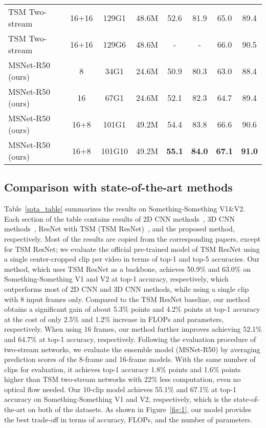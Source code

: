 \documentclass[runningheads]{llncs}
\newcommand{\cmark}{\ding{51}}\newcommand{\xmark}{\ding{55}}
\begin{document}
\begin{table}[h]
{\begin{tabular}{lcccccccc}
TSM Two-stream~\cite{lin2019tsm} & \cmark   	& 16+16  & 129G1 & 48.6M & 52.6 &   81.9 & 65.0 & 89.4\\TSM Two-stream~\cite{lin2019tsm} & \cmark   	& 16+16  & 129G6 & 48.6M & - &   - &66.0 & 90.5\\\midrule
MSNet-R50 (ours) &	& 8 & 34G1 & 24.6M & 50.9 & 80.3 & 63.0 & 88.4 \\ 
MSNet-R50 (ours) &	& 16 & 67G1 & 24.6M & 52.1 & 82.3 & 64.7 & 89.4  \\   
MSNet-R50 (ours) &	 & 16+8 & 101G1 & 49.2M & 54.4 & 83.8 & 66.6 & 90.6 \\ 
MSNet-R50 (ours) &	 & 16+8 & 101G10 & 49.2M & \textbf{55.1} & \textbf{84.0} & \textbf{67.1} & \textbf{91.0}  \\
\bottomrule
\end{tabular}
}
\end{table}

\subsection{Comparison with state-of-the-art methods}

Table~\ref{sota_table} summarizes the results on Something-Something V1\&V2.
Each section of the table contains results of 2D CNN methods~\cite{lee2018motion,liu2019learning,wang2016temporal,zhou2018temporal}, 3D CNN methods~\cite{jiang2019stm,martinez2019action,wang2018videos,xie2018rethinking,zolfaghari2018eco}, ResNet with TSM (TSM ResNet)~\cite{lin2019tsm}, and the proposed method, respectively. Most of the results are copied from the corresponding papers, except for TSM ResNet; we evaluate the official pre-trained model of TSM ResNet using a single center-cropped clip per video in terms of top-1 and top-5 accuracies.
Our method, which uses TSM ResNet as a backbone, achieves 50.9\% and 63.0\% on Something-Something V1 and V2 at top-1 accuracy, respectively, which outperforms most of 2D CNN and 3D CNN methods, while using a single clip with 8 input frames only.
Compared to the TSM ResNet baseline, our method obtains a significant gain of about 5.3\% points and 4.2\% points at top-1 accuracy at the cost of only 2.5\% and 1.2\% increase in FLOPs and parameters, respectively.
When using 16 frames, our method further improves achieving 52.1\% and 64.7\% at top-1 accuracy, respectively.
Following the evaluation procedure of two-stream networks, we evaluate the ensemble model (MSNet-R50) by averaging prediction scores of the 8-frame and 16-frame models.
With the same number of clips for evaluation, it achieves top-1 accuracy 1.8\% points and 1.6\% points higher than TSM two-stream networks with 22\% less computation, even no optical flow needed.
Our 10-clip model achieves 55.1\% and 67.1\% at top-1 accuracy on Something-Something V1 and V2, respectively, which is the state-of-the-art on both of the datasets.
As shown in Figure~\ref{fig:1}, our model provides the best trade-off in terms of accuracy, FLOPs, and the number of parameters.
\end{document}
